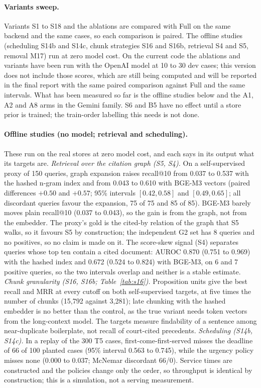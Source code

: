 \paragraph{Variants sweep.} Variants S1 to S18 and the ablations are compared with Full on the same backend and the same cases, so each comparison is paired. The offline studies (scheduling S14b and S14c, chunk strategies S16 and S16b, retrieval S4 and S5, removal M17) run at zero model cost. On the current code the ablations and variants have been run with the OpenAI model at 10 to 30 dev cases; this version does not include those scores, which are still being computed and will be reported in the final report with the same paired comparison against Full and the same intervals. What has been measured so far is the offline studies below and the A1, A2 and A8 arms in the Gemini family. S6 and B5 have no effect until a store prior is trained; the train-order labelling this needs is not done.

\paragraph{Offline studies (no model; retrieval and scheduling).} These run on the real stores at zero model cost, and each says in its output what its targets are. \emph{Retrieval over the citation graph (S5, S4).} On a self-supervised proxy of 150 queries, graph expansion raises recall@10 from 0.037 to 0.537 with the hashed n-gram index and from 0.043 to 0.610 with BGE-M3 vectors (paired differences $+0.50$ and $+0.57$; 95\% intervals $[0.42, 0.58]$ and $[0.49, 0.65]$; all discordant queries favour the expansion, 75 of 75 and 85 of 85). BGE-M3 barely moves plain recall@10 (0.037 to 0.043), so the gain is from the graph, not from the embedder. The proxy's gold is the cited-by relation of the graph that S5 walks, so it favours S5 by construction; the independent G2 set has 8 queries and no positives, so no claim is made on it. The score-skew signal (S4) separates queries whose top ten contain a cited document: AUROC 0.870 (0.751 to 0.969) with the hashed index and 0.672 (0.524 to 0.824) with BGE-M3, on 6 and 7 positive queries, so the two intervals overlap and neither is a stable estimate. \emph{Chunk granularity (S16, S16b; Table~\ref{tab:s16}).} Proposition units give the best recall and MRR at every cutoff on both self-supervised targets, at five times the number of chunks (15,792 against 3,281); late chunking with the hashed embedder is no better than the control, as the true variant needs token vectors from the long-context model. The targets measure findability of a sentence among near-duplicate boilerplate, not recall of court-cited precedents. \emph{Scheduling (S14b, S14c).} In a replay of the 300 T5 cases, first-come-first-served misses the deadline of 66 of 100 planted cases (95\% interval 0.563 to 0.745), while the urgency policy misses none (0.000 to 0.037; McNemar discordant 66/0). Service times are constructed and the policies change only the order, so throughput is identical by construction; this is a simulation, not a serving measurement.

